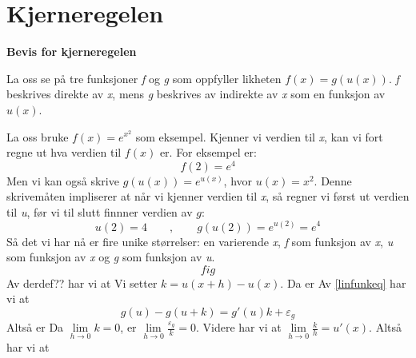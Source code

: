 \section{Kjerneregelen}
\textbf{Bevis for kjerneregelen}

La oss se på tre funksjoner \textit{f} og \textit{g} som oppfyller likheten $f(x)= g(u(x)) $. \textit{f} beskrives direkte av \textit{x}, mens \textit{g} beskrives av indirekte av \textit{x} som en funksjon av $ u(x) $. \vsk

La oss bruke $f(x) =e^{x^2} $ som eksempel. Kjenner vi verdien til \textit{x}, kan vi fort regne ut hva verdien til $ f(x) $ er. For eksempel er: 
\[ f(2)=e^4 \]
Men vi kan også skrive $ g(u(x))=e^{u(x)} $, hvor $ u(x)=x^2 $. Denne skrivemåten impliserer at når vi kjenner verdien til \textit{x}, så regner vi først ut verdien til \textit{u}, før vi til slutt finnner verdien av $g$: 
\[ u(2) =4\qquad,\qquad 
g(u(2))=e^{u(2)}=e^4 \]
Så det vi har nå er fire unike størrelser: en varierende \textit{x}, \textit{f} som funksjon av \textit{x}, \textit{u} som funksjon av \textit{x} og \textit{g} som funksjon av \textit{u}.
\[ fig \]
Av derdef?? har vi at
Vi setter $ k = u(x+h)-u(x) $. Da er
Av \eqref{linfunkeq} har vi at
\[ g(u)-g(u+k)= g'(u)k+\varepsilon_g  \]
Altså er
Da $ \lim\limits_{h\to0}k=0 $, er $ \lim\limits_{h\to0}\frac{\varepsilon_g}{k}=0 $. Videre har vi at $ \lim\limits_{h\to0}\frac{k}{h}=u'(x) $. Altså har vi at
\vspace{11 pt}


